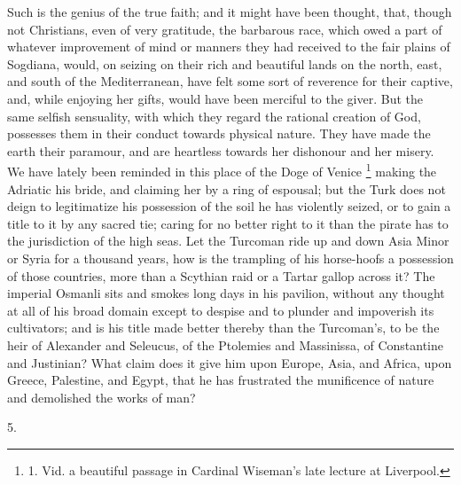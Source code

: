 Such is the genius of the true
faith; and it might have been thought, that, though not Christians,
even of very gratitude, the barbarous race, which owed a part of
whatever improvement of mind or manners they had received to the fair
plains of Sogdiana, would, on seizing on their rich and beautiful
lands on the north, east, and south of the Mediterranean, have felt
some sort of reverence for their captive, and, while enjoying her
gifts, would have been merciful to the giver. But the same selfish
sensuality, with which they regard the rational creation of God,
possesses them in their conduct towards physical nature. They have
made the earth their paramour, and are heartless towards her dishonour
and her misery. We have lately been reminded in this place of the Doge
of Venice \footnote{1. Vid. a beautiful passage in
Cardinal Wiseman's late lecture at Liverpool.} making the
Adriatic his bride, and claiming her by a ring of espousal; but the
Turk does not deign to legitimatize his possession of the soil he has
violently seized, or to gain a title to it by any sacred tie; caring
for no better right to it than the pirate has to the jurisdiction of
the high seas. Let the Turcoman ride up and down Asia Minor or Syria
for a thousand years, how is the trampling of his horse-hoofs a
possession of those countries, more than a Scythian raid or a
Tartar gallop across it? The imperial Osmanli sits and smokes long
days in his pavilion, without any thought at all of his broad domain
except to despise and to plunder and impoverish its cultivators; and
is his title made better thereby than the Turcoman's, to be the heir
of Alexander and Seleucus, of the Ptolemies and Massinissa, of
Constantine and Justinian? What claim does it give him upon Europe,
Asia, and Africa, upon Greece, Palestine, and Egypt, that he has
frustrated the munificence of nature and demolished the works of man?

5.


